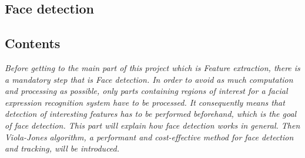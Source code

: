   \begin{titlepage}
    \vspace*{\fill}
      \part{Face detection}
    \vspace*{\fill}
  \end{titlepage}
  
\startcontents[parts]

\chapter*{Contents}

\textit{Before getting to the main part of this project which is Feature extraction, there is a mandatory step that is Face detection. In order to avoid as much computation and processing as possible, only parts containing regions of interest for a facial expression recognition system have to be processed. It consequently means that detection of interesting features has to be performed beforehand, which is the goal of face detection. This part will explain how face detection works in general. Then Viola-Jones algorithm, a performant and cost-effective method for face detection and tracking, will be introduced.}

\vspace{\baselineskip}


\pagebreak


\newpage


\stopcontents[parts]

